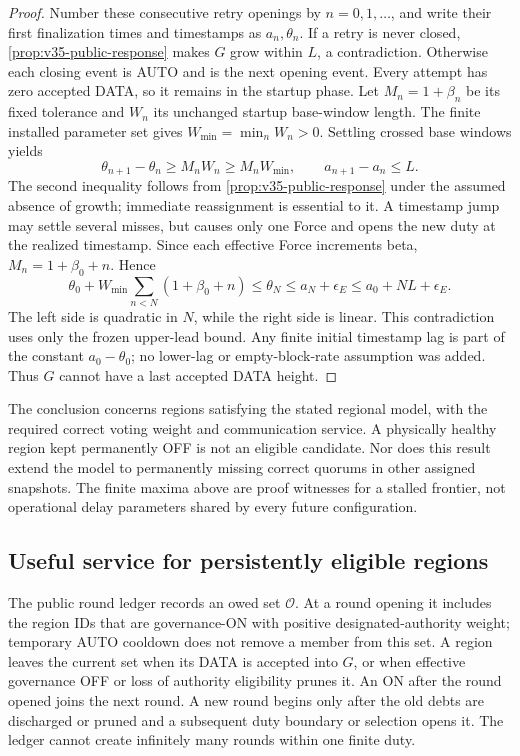 \begin{proof}
Number these consecutive retry openings by $n=0,1,\ldots$, and write
their first finalization times and timestamps as $a_n,\theta_n$.
If a retry is never closed, \cref{prop:v35-public-response} makes $G$
grow within $L$, a contradiction. Otherwise each closing event is AUTO
and is the next opening event. Every attempt has zero accepted DATA,
so it remains in the startup phase. Let $M_n=1+\beta_n$ be its fixed
tolerance and $W_n$ its unchanged startup base-window length. The
finite installed parameter set gives $W_{\min}=\min_n W_n>0$.
Settling crossed base windows yields
\[
 \theta_{n+1}-\theta_n\ge M_nW_n\ge M_nW_{\min},\qquad
 a_{n+1}-a_n\le L.
\]
The second inequality follows from
\cref{prop:v35-public-response} under the assumed absence of growth;
immediate reassignment is essential to it. A timestamp jump may settle
several misses, but causes only one Force and opens the new duty at the
realized timestamp. Since each effective Force increments beta,
$M_n=1+\beta_0+n$. Hence
\[
 \theta_0+W_{\min}\sum_{n<N}(1+\beta_0+n)
 \le\theta_N
 \le a_N+\epsilon_E
 \le a_0+NL+\epsilon_E.
\]
The left side is quadratic in $N$, while the right side is linear.
This contradiction uses only the frozen upper-lead bound. Any finite
initial timestamp lag is part of the constant $a_0-\theta_0$; no
lower-lag or empty-block-rate assumption was added. Thus $G$ cannot
have a last accepted DATA height.
\end{proof}

The conclusion concerns regions satisfying the stated regional model,
with the required correct voting weight and communication service. A
physically healthy region kept permanently OFF is not an eligible
candidate. Nor does this result extend the model to permanently missing
correct quorums in other assigned snapshots. The finite maxima above
are proof witnesses for a stalled frontier, not operational delay
parameters shared by every future configuration.

\subsection{Useful service for persistently eligible regions}
\label{sec:v35-regional-service}
The public round ledger records an owed set $\mathcal O$. At a round
opening it includes the region IDs that are governance-ON with positive
designated-authority weight; temporary AUTO cooldown does not remove a
member from this set. A region leaves the current set when its DATA is
accepted into $G$, or when effective governance OFF or loss of authority
eligibility prunes it. An ON after the round opened joins the next
round. A new round begins only after the old debts are discharged or
pruned and a subsequent duty boundary or selection opens it. The
ledger cannot create infinitely many rounds within one finite duty.

